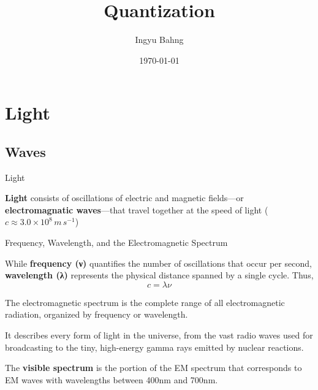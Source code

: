 \documentclass[10pt]{article}
\title{Quantization}
\date{\today}
\author{Ingyu Bahng}
\begin{document}

 
\section{Light}
\label{sect:light}

  \subsection{Waves}

    \begin{core}{Light}

      \textbf{Light} consists of oscillations of electric and magnetic fields---or \textbf{electromagnatic waves}---that travel together at the speed of light ($c \approx 3.0 \times 10^8\,m\,s^{-1}$)


    \end{core}

    \begin{core}{Frequency, Wavelength, and the Electromagnetic Spectrum}

      While \textbf{frequency (ν)} quantifies the number of oscillations that occur per second, \textbf{wavelength (λ)} represents the physical distance spanned by a single cycle. Thus,
      \[
        c = λν
      \]

      The electromagnetic spectrum is the complete range of all electromagnetic radiation, organized by frequency or wavelength.


      It describes every form of light in the universe, from the vast radio waves used for broadcasting to the tiny, high-energy gamma rays emitted by nuclear reactions.

      The \textbf{visible spectrum} is the portion of the EM spectrum that corresponds to EM waves with wavelengths between 400nm and 700nm.

    \end{core}
\end{document}
